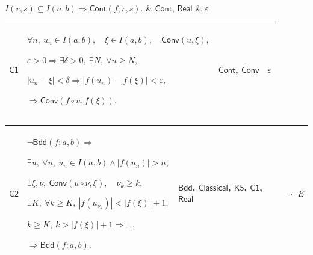 \documentclass[11pt]{amsart}
\newlength{\FTCFourColumnBody}
\begin{document}
{\begin{tabular}
$\displaystyle I(r,s)\subseteq I(a,b)\Rightarrow\textsf{Cont}(f;r,s).$ & \hyperlink{def:Cont}{$\displaystyle \textsf{Cont}$}, \hyperlink{ax:Real}{$\displaystyle \textsf{Real}$} & $\displaystyle \varepsilon$\\ \hline
\end{tabular}%
\par\setlength{\parskip}{0pt}\nointerlineskip
\noindent
\begin{tabular}{|@{}>{\centering\arraybackslash}m{0.078431\FTCFourColumnBody}|>{\centering\arraybackslash}m{0.535947\FTCFourColumnBody}|>{\centering\arraybackslash}m{0.281045\FTCFourColumnBody}|>{\centering\arraybackslash}m{0.104575\FTCFourColumnBody}|}\hline
\hypertarget{proof:C1}{$\displaystyle \textsf{C1}$} & $\displaystyle \forall n,\ u_n\in I(a,b),\quad\xi\in I(a,b),\quad\textsf{Conv}(u,\xi),$\par
$\displaystyle \varepsilon>0\Rightarrow\exists\delta>0,\ \exists N,\ \forall n\ge N,$\par
$\displaystyle |u_n-\xi|<\delta\Rightarrow|f(u_n)-f(\xi)|<\varepsilon,$\par
$\displaystyle \Rightarrow\textsf{Conv}(f\circ u,f(\xi)).$ & \hyperlink{def:Cont}{$\displaystyle \textsf{Cont}$}, \hyperlink{def:Conv}{$\displaystyle \textsf{Conv}$} & $\displaystyle \varepsilon$\\ \hline
\end{tabular}%
\par\setlength{\parskip}{0pt}\nointerlineskip
\noindent
\begin{tabular}{|@{}>{\centering\arraybackslash}m{0.078431\FTCFourColumnBody}|>{\centering\arraybackslash}m{0.535947\FTCFourColumnBody}|>{\centering\arraybackslash}m{0.281045\FTCFourColumnBody}|>{\centering\arraybackslash}m{0.104575\FTCFourColumnBody}|}\hline
\hypertarget{proof:C2}{$\displaystyle \textsf{C2}$} & $\displaystyle \neg\textsf{Bdd}(f;a,b)\Rightarrow$\par
$\displaystyle \exists u,\ \forall n,\ u_n\in I(a,b)\land|f(u_n)|>n,$\par
$\displaystyle \exists\xi,\nu,\ \textsf{Conv}(u\circ\nu,\xi),\quad\nu_k\ge k,$\par
$\displaystyle \exists K,\ \forall k\ge K,\ |f(u_{\nu_k})|<|f(\xi)|+1,$\par
$\displaystyle k\ge K,\ k>|f(\xi)|+1\Rightarrow\bot,$\par
$\displaystyle \Rightarrow\textsf{Bdd}(f;a,b).$ & \hyperlink{def:Bdd}{$\displaystyle \textsf{Bdd}$}, \hyperlink{ax:Classical}{$\displaystyle \textsf{Classical}$}, \hyperlink{proof:K5}{$\displaystyle \textsf{K5}$}, \hyperlink{proof:C1}{$\displaystyle \textsf{C1}$}, \hyperlink{ax:Real}{$\displaystyle \textsf{Real}$} & $\displaystyle \neg\neg E$\\ \hline

\end{tabular}}
\end{document}
